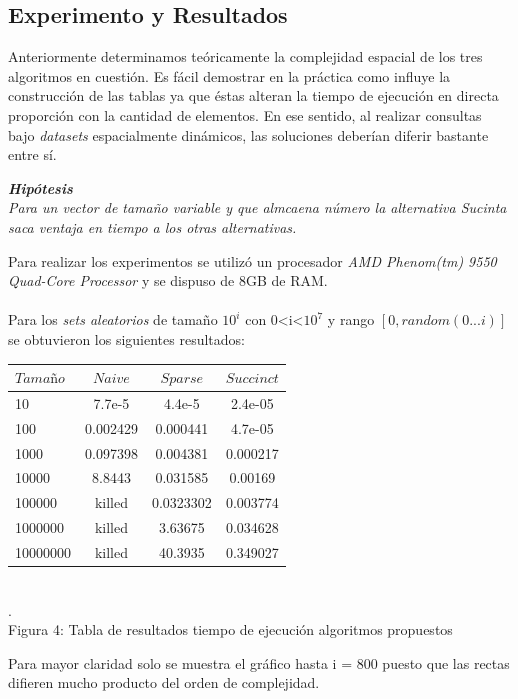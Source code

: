 \documentclass[11pt]{article}
\begin{document}
\subsection{Experimento y Resultados}
Anteriormente determinamos teóricamente la complejidad espacial de los tres algoritmos en cuestión. Es fácil demostrar en la práctica como influye la construcción de las tablas ya que éstas alteran la tiempo de ejecución en directa proporción con la cantidad de elementos. En ese sentido, al realizar consultas bajo \emph{datasets} espacialmente dinámicos, las soluciones deberían diferir bastante entre sí.\begin{center}\emph{\textbf{Hipótesis}\\Para un vector de tamaño variable y que almcaena número la alternativa Sucinta saca ventaja en tiempo a los otras alternativas.}\end{center}Para realizar los experimentos se utilizó un procesador \emph{AMD Phenom(tm) 9550 Quad-Core Processor} y se dispuso de 8GB de RAM. \\\\Para los \emph{sets aleatorios} de tamaño $10^i$ con 0<i<$10^7$ y rango $[0,random(0...i)]$ se obtuvieron los siguientes resultados:
\begin{center}\begin{tabular}{|l|c|c|c|}
\hline
	$Tamaño$ & $Naive$ & $Sparse$ & $Succinct$\\
\hline
	10       & 7.7e-5   & 4.4e-5      & 2.4e-05\\
\hline
	100 	 & 0.002429 & 0.000441    & 4.7e-05 \\
\hline
	1000     & 0.097398 & 0.004381    & 0.000217\\
\hline
	10000    & 8.8443   & 0.031585    & 0.00169\\
\hline
	100000   & killed   & 0.0323302   & 0.003774\\
\hline
	1000000  & killed   & 3.63675     & 0.034628\\
\hline
	10000000 & killed   & 40.3935     & 0.349027\\
\hline
\end{tabular}
\\\scriptsize{\color{white}.\color{black}\\Figura 4: Tabla de resultados tiempo de ejecución algoritmos propuestos}
\end{center}
Para mayor claridad solo se muestra el gráfico hasta i = 800 puesto que las rectas difieren mucho producto del orden de complejidad.
\end{document}
